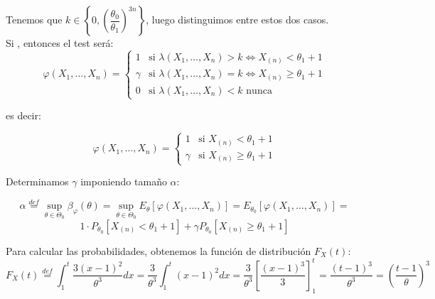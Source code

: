 \documentclass[12pt]{article}
\begin{document}
\begin{ejercicio}[2 puntos]
\begin{figure}[H]
        \end{figure}

        Tenemos que $k \in \left\{0, \left( \dfrac{\theta_0}{\theta_1} \right)^{3n} \right\}$, luego distinguimos entre estos dos casos. \\

        Si , entonces el test será:
        $$\varphi(X_1, \ldots, X_n) = \begin{cases}
            1 &\text{si } \lambda(X_1, \ldots, X_n) > k \iff X_{(n)} < \theta_1 + 1 \\
            \gamma &\text{si } \lambda(X_1, \ldots, X_n) = k \iff X_{(n)} \geq \theta_1 + 1 \\
            0 &\text{si } \lambda(X_1, \ldots, X_n) < k \text{ nunca}
        \end{cases}$$

        es decir:

        $$\varphi(X_1, \ldots, X_n) = \begin{cases}
            1 &\text{si } X_{(n)} < \theta_1 + 1 \\
            \gamma &\text{si } X_{(n)} \geq \theta_1 + 1
        \end{cases}$$

        Determinamos $\gamma$ imponiendo tamaño $\alpha$:

        $$\alpha \stackrel{def} = \sup_{\theta \in \Theta_0} \beta_{\varphi}(\theta) =  \sup_{\theta \in \Theta_0} E_\theta[\varphi(X_1, \ldots, X_n)] = E_{\theta_0}[\varphi(X_1, \ldots, X_n)] = $$
        $$1 \cdot P_{\theta_0}[X_{(n)} < \theta_1 + 1] + \gamma P_{\theta_0}[X_{(n)} \geq \theta_1 + 1] $$

        Para calcular las probabilidades, obtenemos la función de distribución $F_X(t)$:
        $$F_X(t) \stackrel{def}{=} \int_{1}^{t} \frac{3{(x-1)}^{2}}{\theta^3} dx = \dfrac{3}{\theta^3} \int_{1}^{t} (x-1)^{2} dx = \dfrac{3}{\theta^3} \left[ \dfrac{(x-1)^3}{3} \right]_1^t = \dfrac{(t-1)^3}{\theta^3} = 
        \left( \dfrac{t-1}{\theta} \right)^3$$


\end{ejercicio}
\end{document}
